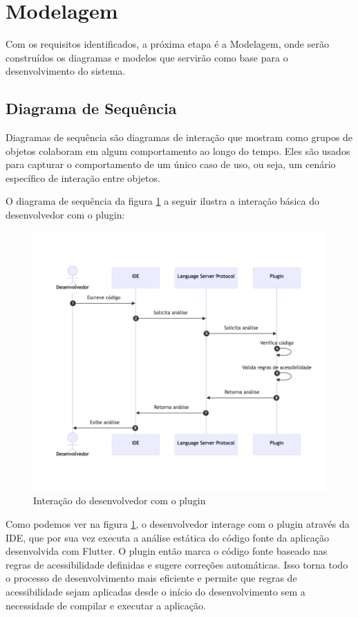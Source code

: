 \section{Modelagem}

Com os requisitos identificados, a próxima etapa é a Modelagem, onde serão construídos os diagramas e modelos que servirão como base para o desenvolvimento do sistema.

\subsection{Diagrama de Sequência}

Diagramas de sequência são diagramas de interação que mostram como grupos de objetos colaboram em algum comportamento ao longo do tempo. Eles são usados para capturar o comportamento de um único caso de uso, ou seja, um cenário específico de interação entre objetos.

O diagrama de sequência da figura \ref{fig:diagrama-sequencia-plugin} a seguir ilustra a interação básica do desenvolvedor com o plugin:

\begin{figure}[!h]
	\centering
	\caption{Interação do desenvolvedor com o plugin}\label{fig:diagrama-sequencia-plugin}
	\includegraphics[width=325pt]{Assets/DiagramaSequenciaIDELSPPlugin.png}
\end{figure}

Como podemos ver na figura \ref{fig:diagrama-sequencia-plugin}, o desenvolvedor interage com o plugin através da IDE, que por sua vez executa a análise estática do código fonte da aplicação desenvolvida com Flutter. O plugin então marca o código fonte baseado nas regras de acessibilidade definidas e sugere correções automáticas. Isso torna todo o processo de desenvolvimento mais eficiente e permite que regras de acessibilidade sejam aplicadas desde o início do desenvolvimento sem a necessidade de compilar e executar a aplicação.

